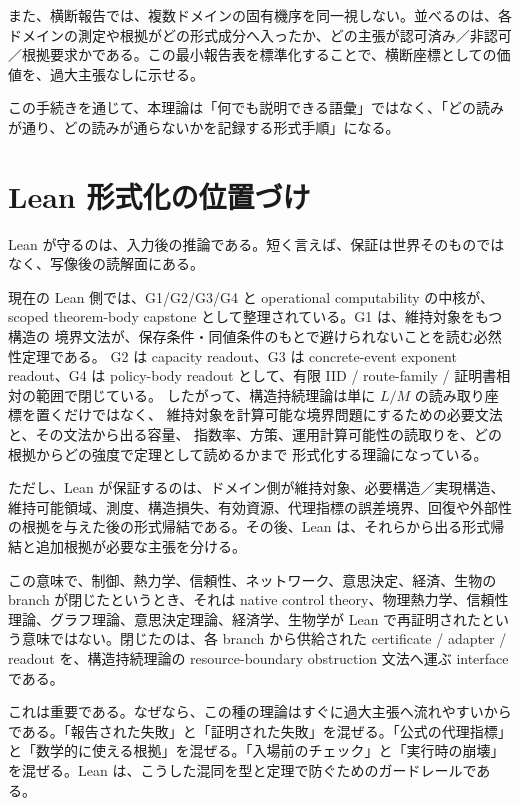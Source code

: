 \documentclass[12pt,a4paper]{article}
\begin{document}
また、横断報告では、複数ドメインの固有機序を同一視しない。並べるのは、各ドメインの測定や根拠がどの形式成分へ入ったか、どの主張が認可済み／非認可／根拠要求かである。この最小報告表を標準化することで、横断座標としての価値を、過大主張なしに示せる。

この手続きを通じて、本理論は「何でも説明できる語彙」ではなく、「どの読みが通り、どの読みが通らないかを記録する形式手順」になる。

\section{Lean 形式化の位置づけ}\label{lean-ux5f62ux5f0fux5316ux306eux4f4dux7f6eux3065ux3051}

Lean が守るのは、入力後の推論である。短く言えば、保証は世界そのものではなく、写像後の読解面にある。

現在の Lean 側では、G1/G2/G3/G4 と operational computability の中核が、 scoped theorem-body capstone として整理されている。G1 は、維持対象をもつ構造の 境界文法が、保存条件・同値条件のもとで避けられないことを読む必然性定理である。 G2 は capacity readout、G3 は concrete-event exponent readout、G4 は policy-body readout として、有限 IID / route-family / 証明書相対の範囲で閉じている。 したがって、構造持続理論は単に \(L/M\) の読み取り座標を置くだけではなく、 維持対象を計算可能な境界問題にするための必要文法と、その文法から出る容量、 指数率、方策、運用計算可能性の読取りを、どの根拠からどの強度で定理として読めるかまで 形式化する理論になっている。

ただし、Lean が保証するのは、ドメイン側が維持対象、必要構造／実現構造、維持可能領域、測度、構造損失、有効資源、代理指標の誤差境界、回復や外部性の根拠を与えた後の形式帰結である。その後、Lean は、それらから出る形式帰結と追加根拠が必要な主張を分ける。

この意味で、制御、熱力学、信頼性、ネットワーク、意思決定、経済、生物の branch が閉じたというとき、それは native control theory、物理熱力学、信頼性理論、グラフ理論、意思決定理論、経済学、生物学が Lean で再証明されたという意味ではない。閉じたのは、各 branch から供給された certificate / adapter / readout を、構造持続理論の resource-boundary obstruction 文法へ運ぶ interface である。

これは重要である。なぜなら、この種の理論はすぐに過大主張へ流れやすいからである。「報告された失敗」と「証明された失敗」を混ぜる。「公式の代理指標」と「数学的に使える根拠」を混ぜる。「入場前のチェック」と「実行時の崩壊」を混ぜる。Lean は、こうした混同を型と定理で防ぐためのガードレールである。
\end{document}
